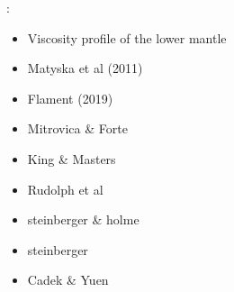 \Literature:
\begin{itemize} 
\item Viscosity profile of the lower mantle \cite{elss85}
\item Matyska et al (2011) \cite{mayw11}
\item Flament (2019) \cite{flam19}
\item Mitrovica \& Forte \cite{mifo04}
\item King \& Masters \cite{kima92}
\item Rudolph et al \cite{rull15}
\item steinberger \& holme \cite{stho08}
\item steinberger \cite{stei16}
\item Cadek \& Yuen \cite{cayu93}
\end{itemize} 
